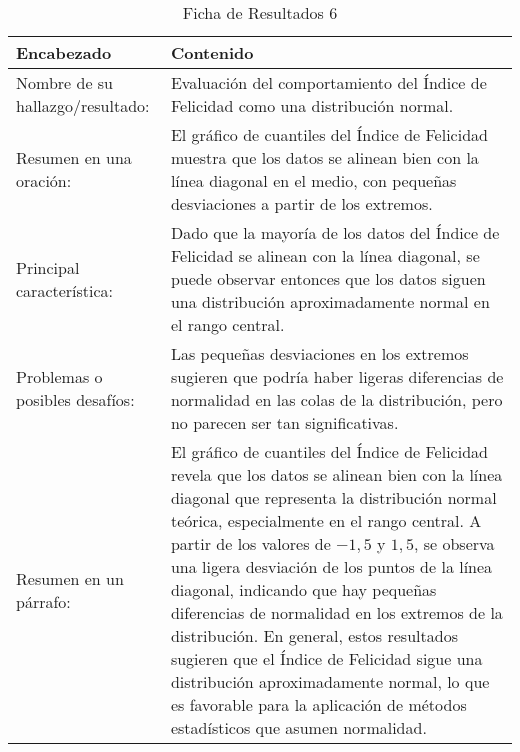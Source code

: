 \begin{table}[H]
    \caption{Ficha de Resultados 6}
    \begin{center}
        \begin{tabular}{  m{3cm} | m{12cm}  }
        \hline
        \textbf{ Encabezado} & \textbf{Contenido }\\ 
        \hline
        Nombre de su hallazgo/resultado: & Evaluación del comportamiento del Índice de Felicidad como una distribución normal.\\ 
        \hline
        Resumen en una oración: & El gráfico de cuantiles del Índice de Felicidad muestra que los datos se alinean bien con la línea diagonal en el medio, con pequeñas desviaciones a partir de los extremos.\\ 
        \hline
        Principal característica: & Dado que la mayoría de los datos del Índice de Felicidad se alinean con la línea diagonal, se puede observar entonces que los datos siguen una distribución aproximadamente normal en el rango central. \\ 
        \hline
        Problemas o posibles desafíos: & Las pequeñas desviaciones en los extremos sugieren que podría haber ligeras diferencias de normalidad en las colas de la distribución, pero no parecen ser tan significativas.\\ 
        \hline
        Resumen en un párrafo: &  El gráfico de cuantiles del Índice de Felicidad revela que los datos se alinean bien con la línea diagonal que representa la distribución normal teórica, especialmente en el rango central. A partir de los valores de $-1,5$ y $1,5$, se observa una ligera desviación de los puntos de la línea diagonal, indicando que hay pequeñas diferencias de normalidad en los extremos de la distribución. En general, estos resultados sugieren que el Índice de Felicidad sigue una distribución aproximadamente normal, lo que es favorable para la aplicación de métodos estadísticos que asumen normalidad. \\ 
        \hline
        \end{tabular}
    \end{center}
\end{table}


